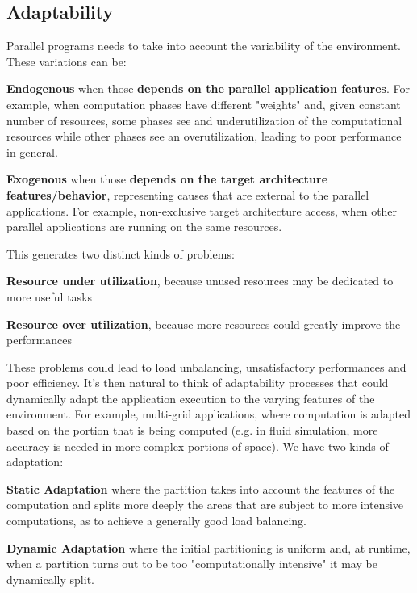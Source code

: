 \documentclass[10pt]{report}
\begin{document}
\subsection{Adaptability}
Parallel programs needs to take into account the variability of the environment. These variations can be:
\begin{list}{}{}
	\item \textbf{Endogenous} when those \textbf{depends on the parallel application features}. For example, when computation phases have different "weights" and, given constant number of resources, some phases see and underutilization of the computational resources while other phases see an overutilization, leading to poor performance in general.
	\item \textbf{Exogenous} when those \textbf{depends on the target architecture features/behavior}, representing causes that are external to the parallel applications. For example, non-exclusive target architecture access, when other parallel applications are running on the same resources.
\end{list}
This generates two distinct kinds of problems:
\begin{list}{}{}
	\item \textbf{Resource under utilization}, because unused resources may be dedicated to more useful tasks
	\item \textbf{Resource over utilization}, because more resources could greatly improve the performances
\end{list}
These problems could lead to load unbalancing, unsatisfactory performances and poor efficiency. It's then natural to think of adaptability processes that could dynamically adapt the application execution to the varying features of the environment. For example, multi-grid applications, where computation is adapted based on the portion that is being computed (e.g. in fluid simulation, more accuracy is needed in more complex portions of space). We have two kinds of adaptation:
\begin{list}{}{}
	\item \textbf{Static Adaptation} where the partition takes into account the features of the computation and splits more deeply the areas that are subject to more intensive computations, as to achieve a generally good load balancing.
	\item \textbf{Dynamic Adaptation} where the initial partitioning is uniform and, at runtime, when a partition turns out to be too "computationally intensive" it may be dynamically split.
\end{list}
\end{document}
